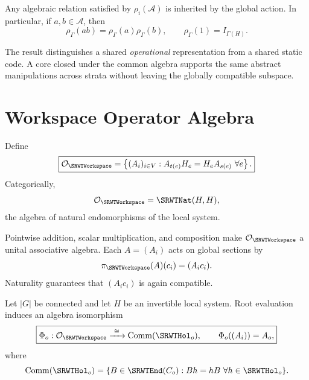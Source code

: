 \begin{SRWTcorollary}\label{SRWT:cor:inherited-structure}
Any algebraic relation satisfied by \(\rho_i(\mathcal A)\) is inherited by the
global action. In particular, if \(a,b\in\mathcal A\), then
\[
\rho_\Gamma(ab)=\rho_\Gamma(a)\rho_\Gamma(b),
\qquad
\rho_\Gamma(1)=I_{\Gamma(H)}.
\]
\end{SRWTcorollary}

The result distinguishes a shared \emph{operational} representation from a
shared static code. A core closed under the common algebra supports the same
abstract manipulations across strata without leaving the globally compatible
subspace.

\section{Workspace Operator Algebra}

\begin{SRWTdefinition}\label{SRWT:def:workspace-operator-algebra}
Define
\[
\boxed{
\mathcal O_{\SRWTWorkspace}
=
\left\{
(A_i)_{i\in V}:
A_{t(e)}H_e=H_eA_{s(e)}\ \forall e
\right\}.
}
\]
Categorically,
\[
\mathcal O_{\SRWTWorkspace}=\SRWTNat(H,H),
\]
the algebra of natural endomorphisms of the local system.
\end{SRWTdefinition}

Pointwise addition, scalar multiplication, and composition make
\(\mathcal O_{\SRWTWorkspace}\) a unital associative algebra. Each
\(A=(A_i)\) acts on global sections by
\[
\pi_{\SRWTWorkspace}(A)(c_i)=(A_ic_i).
\]
Naturality guarantees that \((A_ic_i)\) is again compatible.

\begin{SRWTtheorem}\label{SRWT:thm:commutant-characterization}
Let \(|G|\) be connected and let \(H\) be an invertible local system. Root
evaluation induces an algebra isomorphism
\[
\boxed{
\Phi_o:\mathcal O_{\SRWTWorkspace}
\xrightarrow{\ \cong\ }
\operatorname{Comm}(\SRWTHol_o),
\qquad
\Phi_o((A_i))=A_o,
}
\]
where
\[
\operatorname{Comm}(\SRWTHol_o)
=
\{B\in\SRWTEnd(C_o):Bh=hB\ \forall h\in\SRWTHol_o\}.
\]
\end{SRWTtheorem}

